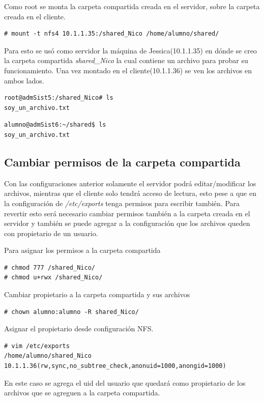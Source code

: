 \documentclass[12pt]{article}
\begin{document}
Como root se monta la carpeta compartida creada en el servidor, sobre la carpeta creada en el cliente. 
\begin{lstlisting}[frame=single]
# mount -t nfs4 10.1.1.35:/shared_Nico /home/alumno/shared/
\end{lstlisting}

Para esto se usó como servidor la máquina de Jessica(10.1.1.35) en dónde se creo la carpeta compartida \emph{shared\_Nico} la cual contiene un archivo para probar su funcionamiento. Una vez montado en el cliente(10.1.1.36) se ven los archivos en ambos lados.
\bigskip
\begin{lstlisting}[frame=single]
root@admSist5:/shared_Nico# ls
soy_un_archivo.txt
\end{lstlisting}

\begin{lstlisting}[frame=single]
alumno@admSist6:~/shared$ ls
soy_un_archivo.txt
\end{lstlisting}

\subsection{Cambiar permisos de la carpeta compartida}

Con las configuraciones anterior solamente el servidor podrá editar/modificar los archivos, mientras que el cliente solo tendrá acceso de lectura, esto pese a que en la configuración de \emph{/etc/exports} tenga permisos para escribir también. Para revertir esto será necesario cambiar permisos también a la carpeta creada en el servidor y también se puede agregar a la configuración que los archivos queden con propietario de un usuario.

Para asignar los permisos a la carpeta compartida
\begin{lstlisting}[frame=single]
# chmod 777 /shared_Nico/
# chmod u+rwx /shared_Nico/
\end{lstlisting}

Cambiar propietario a la carpeta compartida y sus archivos 
\begin{lstlisting}[frame=single]
# chown alumno:alumno -R shared_Nico/
\end{lstlisting}

Asignar el propietario desde configuración NFS.
\begin{lstlisting}[frame=single]
# vim /etc/exports
/home/alumno/shared_Nico 10.1.1.36(rw,sync,no_subtree_check,anonuid=1000,anongid=1000)
\end{lstlisting}
En este caso se agrega el uid del usuario que quedará como propietario de los archivos que se agreguen a la carpeta compartida.
\end{document}
